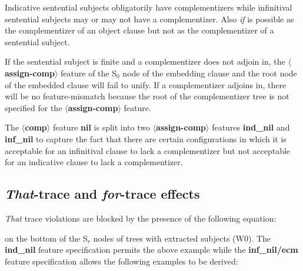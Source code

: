 \beginsentences
{}\label{ex:241} 
\endsentences

 
Indicative sentential subjects obligatorily have complementizers while 
infinitival sentential subjects may or may not have a complementizer. 
Also {\em if} is possible as the complementizer of an object clause 
but not as the complementizer of a sentential subject. 
 
\beginsentences
{}\label{ex:242} 
\label{ex:243} 
\label{ex:244} 
\endsentences

 
If the sentential subject is finite and a complementizer does 
not adjoin in, the {\bf $\langle$assign-comp$\rangle$} feature of the 
S$_{0}$ node of the embedding clause and the root node of the 
embedded clause will fail to unify. If a complementizer adjoins in, 
there will be no feature-mismatch because the root of the 
complementizer tree is not specified for the {\bf $\langle$assign-comp$\rangle$} feature. 
 
The {\bf $\langle$comp$\rangle$} feature {\bf nil} is split into two 
{\bf $\langle$assign-comp$\rangle$} features {\bf ind\_nil} and 
{\bf inf\_nil} to capture the fact that there are certain configurations in 
which it is acceptable for an infinitival clause to lack a complementizer 
but not acceptable for an indicative clause to lack a complementizer. 
 
\subsection{{\em That}-trace and {\em for}-trace effects} 
 
\beginsentences
{}\label{ex:245} 
\endsentences

 
{\em That} trace violations are blocked by the presence of the following 
equation: 
 
\beginsentences
{}\label{ex:246} 
\endsentences

 
on the bottom of the S$_{r}$ nodes of trees with extracted subjects (W0). 
The {\bf ind\_nil} feature specification permits the above example 
while the {\bf inf\_nil/ecm} feature specification allows the 
following examples to be derived: 
 
